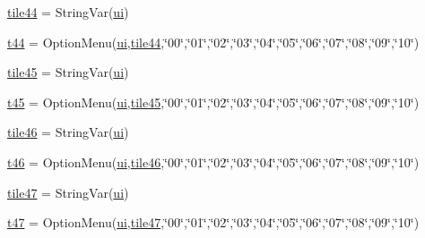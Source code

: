 \begin{DoxyCompactItemize}
\item 
\mbox{\hyperlink{namespacegui_af46f15a9a3ebad6b6b8e98adb5eb0f2d}{tile44}} = String\+Var(\mbox{\hyperlink{namespacegui_a40ab7281456eadbea2dc2038f5c24fa1}{ui}})
\item 
\mbox{\hyperlink{namespacegui_ad2995237a38478e1524b0742655d3a52}{t44}} = Option\+Menu(\mbox{\hyperlink{namespacegui_a40ab7281456eadbea2dc2038f5c24fa1}{ui}},\mbox{\hyperlink{namespacegui_af46f15a9a3ebad6b6b8e98adb5eb0f2d}{tile44}},\char`\"{}00\char`\"{},\char`\"{}01\char`\"{},\char`\"{}02\char`\"{},\char`\"{}03\char`\"{},\char`\"{}04\char`\"{},\char`\"{}05\char`\"{},\char`\"{}06\char`\"{},\char`\"{}07\char`\"{},\char`\"{}08\char`\"{},\char`\"{}09\char`\"{},\char`\"{}10\char`\"{})
\item 
\mbox{\hyperlink{namespacegui_ac936253f399ab927a2fd3a8b1be73902}{tile45}} = String\+Var(\mbox{\hyperlink{namespacegui_a40ab7281456eadbea2dc2038f5c24fa1}{ui}})
\item 
\mbox{\hyperlink{namespacegui_a4ba8213015870947fb113938370c780d}{t45}} = Option\+Menu(\mbox{\hyperlink{namespacegui_a40ab7281456eadbea2dc2038f5c24fa1}{ui}},\mbox{\hyperlink{namespacegui_ac936253f399ab927a2fd3a8b1be73902}{tile45}},\char`\"{}00\char`\"{},\char`\"{}01\char`\"{},\char`\"{}02\char`\"{},\char`\"{}03\char`\"{},\char`\"{}04\char`\"{},\char`\"{}05\char`\"{},\char`\"{}06\char`\"{},\char`\"{}07\char`\"{},\char`\"{}08\char`\"{},\char`\"{}09\char`\"{},\char`\"{}10\char`\"{})
\item 
\mbox{\hyperlink{namespacegui_a7121cbe6f2d65b30d9c5e3eedb79679b}{tile46}} = String\+Var(\mbox{\hyperlink{namespacegui_a40ab7281456eadbea2dc2038f5c24fa1}{ui}})
\item 
\mbox{\hyperlink{namespacegui_ab72c0c9ec8577738389412a4861e90da}{t46}} = Option\+Menu(\mbox{\hyperlink{namespacegui_a40ab7281456eadbea2dc2038f5c24fa1}{ui}},\mbox{\hyperlink{namespacegui_a7121cbe6f2d65b30d9c5e3eedb79679b}{tile46}},\char`\"{}00\char`\"{},\char`\"{}01\char`\"{},\char`\"{}02\char`\"{},\char`\"{}03\char`\"{},\char`\"{}04\char`\"{},\char`\"{}05\char`\"{},\char`\"{}06\char`\"{},\char`\"{}07\char`\"{},\char`\"{}08\char`\"{},\char`\"{}09\char`\"{},\char`\"{}10\char`\"{})
\item 
\mbox{\hyperlink{namespacegui_a09c1aa53fc228e0b1f3645149832c496}{tile47}} = String\+Var(\mbox{\hyperlink{namespacegui_a40ab7281456eadbea2dc2038f5c24fa1}{ui}})
\item 
\mbox{\hyperlink{namespacegui_afecc97dbd52b5ac17c2bc1fb79c14b14}{t47}} = Option\+Menu(\mbox{\hyperlink{namespacegui_a40ab7281456eadbea2dc2038f5c24fa1}{ui}},\mbox{\hyperlink{namespacegui_a09c1aa53fc228e0b1f3645149832c496}{tile47}},\char`\"{}00\char`\"{},\char`\"{}01\char`\"{},\char`\"{}02\char`\"{},\char`\"{}03\char`\"{},\char`\"{}04\char`\"{},\char`\"{}05\char`\"{},\char`\"{}06\char`\"{},\char`\"{}07\char`\"{},\char`\"{}08\char`\"{},\char`\"{}09\char`\"{},\char`\"{}10\char`\"{})

\end{DoxyCompactItemize}
